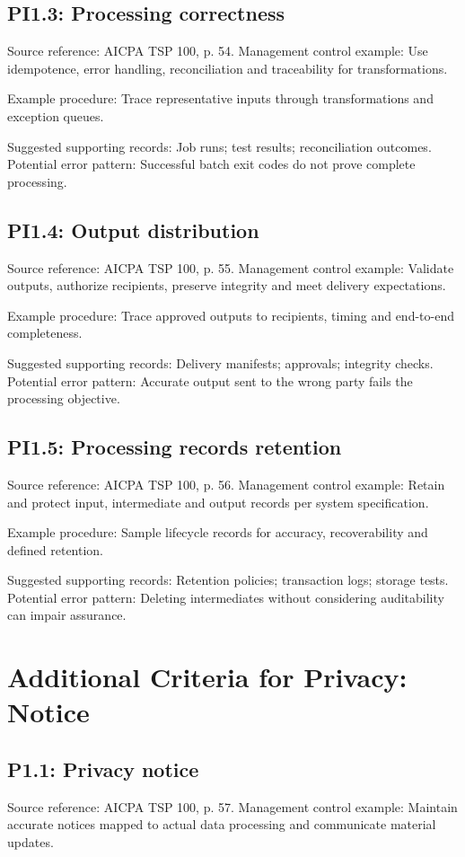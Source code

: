 \documentclass[10pt,oneside]{report}
\begin{document}
\subsection*{PI1.3: Processing correctness}
Source reference: AICPA TSP 100, p. 54. Management control example: Use idempotence, error handling, reconciliation and traceability for transformations.

Example procedure: Trace representative inputs through transformations and exception queues.

Suggested supporting records: Job runs; test results; reconciliation outcomes. Potential error pattern: Successful batch exit codes do not prove complete processing.

\subsection*{PI1.4: Output distribution}
Source reference: AICPA TSP 100, p. 55. Management control example: Validate outputs, authorize recipients, preserve integrity and meet delivery expectations.

Example procedure: Trace approved outputs to recipients, timing and end-to-end completeness.

Suggested supporting records: Delivery manifests; approvals; integrity checks. Potential error pattern: Accurate output sent to the wrong party fails the processing objective.

\subsection*{PI1.5: Processing records retention}
Source reference: AICPA TSP 100, p. 56. Management control example: Retain and protect input, intermediate and output records per system specification.

Example procedure: Sample lifecycle records for accuracy, recoverability and defined retention.

Suggested supporting records: Retention policies; transaction logs; storage tests. Potential error pattern: Deleting intermediates without considering auditability can impair assurance.

\section{Additional Criteria for Privacy: Notice}
\subsection*{P1.1: Privacy notice}
Source reference: AICPA TSP 100, p. 57. Management control example: Maintain accurate notices mapped to actual data processing and communicate material updates.
\end{document}
